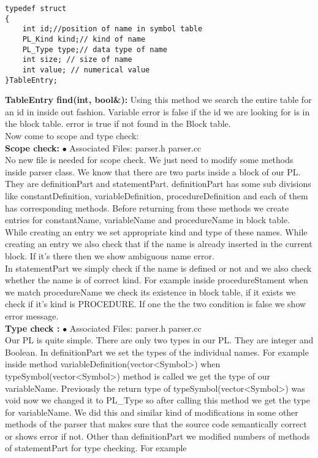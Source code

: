 \documentclass[paper=letter, fontsize=11pt]{scrartcl} %
\begin{document}
\begin{lstlisting}
typedef struct
{
	int id;//position of name in symbol table
	PL_Kind kind;// kind of name
	PL_Type type;// data type of name
	int size; // size of name
	int value; // numerical value
}TableEntry;
\end{lstlisting}
\pagebreak
{\bf TableEntry find(int, bool\&):} Using this method we search the entire table for an id in inside out fashion. Variable error is false if the id we are looking for is in
the block table. error is true if not found in the Block table.\\

Now come to scope and type check:\\

{\bf Scope check:}
$\bullet$ Associated Files: parser.h parser.cc\\
No new file is needed for scope check. We just need to modify some methods inside parser class. We know that there are two parts inside a block of our PL. They are definitionPart and statementPart. definitionPart has some sub divisions like constantDefinition, variableDefinition, procedureDefinition and each of them has corresponding methods. Before returning from these methods we create entries for constantName, variableName and procedureName in  block table. While creating an entry we set appropriate kind and type of these names. While creating an entry we also check that if the name is already inserted in the current block. If it's there then we show ambiguous name error.\\
In statementPart we simply check if the name is defined or not and we also check whether the name is of correct kind. For example inside procedureStament when we match procedureName we check its existence in block table, if it exists we check if it's kind is PROCEDURE. If one the the two condition is false we show error message. \\

{\bf Type check :}      
$\bullet$ Associated Files: parser.h parser.cc\\
Our PL is quite simple. There are only two types in our PL. They are integer and Boolean. In definitionPart we set the types of the individual names. For example inside method variableDefinition(vector<Symbol>) when typeSymbol(vector<Symbol>) method is  called we get the type of our variableName. Previously the return type of typeSymbol(vector<Symbol>) was void now we changed it to PL\_Type so after calling this method we get the type for variableName. We did this and similar kind of modifications in some other methods of the parser that makes sure that the source code semantically correct or shows error if not. Other than definitionPart we modified numbers of methods of statementPart for type checking. For example\\
\end{document}
